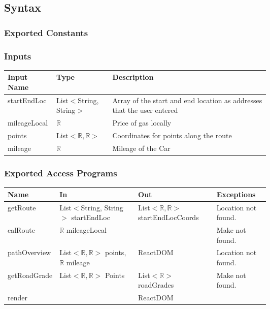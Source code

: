 \documentclass[12pt, titlepage]{article}
\begin{document}
\subsection{Syntax}

\subsubsection{Exported Constants}

\subsubsection{Inputs}
\begin{tabular}{| l | l | p{0.6\linewidth}|}
  \hline
  \textbf{Input Name} & \textbf{Type} & \textbf{Description}\\
  \hline
  startEndLoc & List$<$String, String$>$ & Array of the start and end location as addresses that the user entered \\
  \hline
  mileageLocal & $\mathbb{R}$ & Price of gas locally \\
  \hline
  points & List$<\mathbb{R},\mathbb{R}>$  & Coordinates for points along the route \\
  \hline
  mileage & $\mathbb{R}$ & Mileage of the Car \\
  \hline
\end{tabular}

\subsubsection{Exported Access Programs}

\begin{tabular}{| l |  p{0.3\linewidth}|  p{0.3\linewidth}| l |}
  \hline
  \textbf{Name} & \textbf{In} & \textbf{Out} & \textbf{Exceptions}\\
  \hline
  getRoute & List$<$String, String$>$ startEndLoc & List$<\mathbb{R},\mathbb{R}>$  startEndLocCoords & Location not found.\\
  \hline
  calRoute & $\mathbb{R}$ mileageLocal & ~ & Make not found.\\
  \hline
  pathOverview & List$<\mathbb{R},\mathbb{R}>$ points, $\mathbb{R}$ mileage  & ReactDOM & Location not found.\\
  \hline
  getRoadGrade & List$<\mathbb{R},\mathbb{R}>$ Points & List$<\mathbb{R}>$ roadGrades & Make not found.\\
  \hline
  render & ~ & ReactDOM & ~\\
  \hline
\end{tabular}
\end{document}

